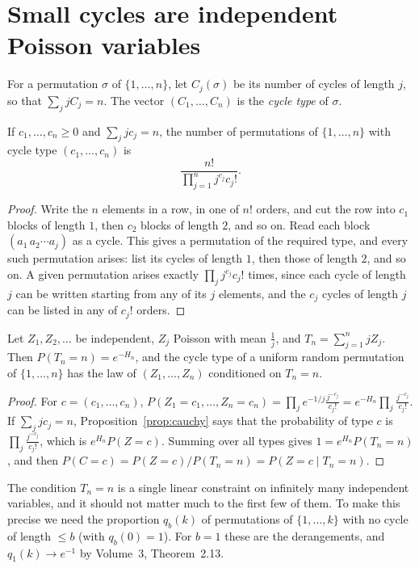 \section{Small cycles are independent Poisson variables}

For a permutation $\sigma$ of $\{1,\dots,n\}$, let $C_j(\sigma)$ be its number of cycles of length $j$, so that $\sum_jjC_j=n$. The vector $(C_1,\dots,C_n)$ is the \emph{cycle type} of $\sigma$.

\begin{proposition}\label{prop:cauchy}
If $c_1,\dots,c_n\ge0$ and $\sum_jjc_j=n$, the number of permutations of $\{1,\dots,n\}$ with cycle type $(c_1,\dots,c_n)$ is
\[
\frac{n!}{\prod_{j=1}^nj^{c_j}c_j!}.
\]
\end{proposition}
\begin{proof}
Write the $n$ elements in a row, in one of $n!$ orders, and cut the row into $c_1$ blocks of length $1$, then $c_2$ blocks of length $2$, and so on. Read each block $(a_1\,a_2\cdots a_j)$ as a cycle. This gives a permutation of the required type, and every such permutation
arises: list its cycles of length $1$, then those of length $2$, and so on. A given permutation arises exactly $\prod_jj^{c_j}c_j!$ times, since each cycle of length $j$ can be written starting from any of its $j$ elements, and the $c_j$ cycles of length $j$ can be listed in any of $c_j!$ orders.
\end{proof}

\begin{theorem}\label{thm:conditioning}
Let $Z_1,Z_2,\dots$ be independent, $Z_j$ Poisson with mean $\frac1j$, and $T_n=\sum_{j=1}^njZ_j$. Then $P(T_n=n)=e^{-H_n}$, and the cycle type of a uniform random permutation of $\{1,\dots,n\}$ has the law of $(Z_1,\dots,Z_n)$ conditioned on $T_n=n$.
\end{theorem}
\begin{proof}
For $c=(c_1,\dots,c_n)$, $P(Z_1=c_1,\dots,Z_n=c_n)=\prod_je^{-1/j}\frac{j^{-c_j}}{c_j!}=e^{-H_n}\prod_j\frac{j^{-c_j}}{c_j!}$. If $\sum_jjc_j=n$, Proposition~\ref{prop:cauchy} says that the probability of type $c$ is $\prod_j\frac{j^{-c_j}}{c_j!}$, which is $e^{H_n}P(Z=c)$.
Summing over all types gives $1=e^{H_n}P(T_n=n)$, and then $P(C=c)=P(Z=c)/P(T_n=n)=P(Z=c\mid T_n=n)$.
\end{proof}

The condition $T_n=n$ is a single linear constraint on infinitely many independent variables, and it should not matter much to the first few of them. To make this precise we need the proportion $q_b(k)$ of permutations of $\{1,\dots,k\}$ with no cycle of length $\le b$
(with $q_b(0)=1$). For $b=1$ these are the derangements, and $q_1(k)\to e^{-1}$ by Volume~3, Theorem~2.13.


